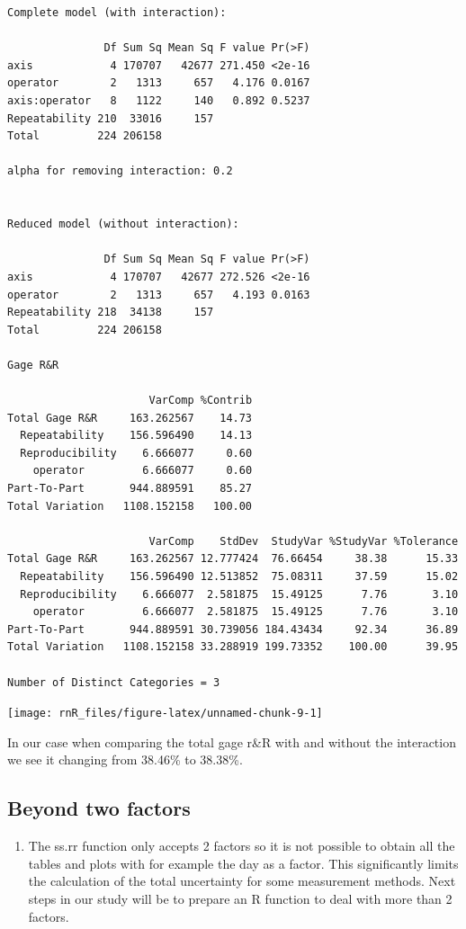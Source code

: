 \documentclass[
]{book}
\providecommand{\tightlist}{%
  \setlength{\itemsep}{0pt}\setlength{\parskip}{0pt}}
\begin{document}
\begin{verbatim}
Complete model (with interaction):

               Df Sum Sq Mean Sq F value Pr(>F)
axis            4 170707   42677 271.450 <2e-16
operator        2   1313     657   4.176 0.0167
axis:operator   8   1122     140   0.892 0.5237
Repeatability 210  33016     157               
Total         224 206158                       

alpha for removing interaction: 0.2 


Reduced model (without interaction):

               Df Sum Sq Mean Sq F value Pr(>F)
axis            4 170707   42677 272.526 <2e-16
operator        2   1313     657   4.193 0.0163
Repeatability 218  34138     157               
Total         224 206158                       

Gage R&R

                      VarComp %Contrib
Total Gage R&R     163.262567    14.73
  Repeatability    156.596490    14.13
  Reproducibility    6.666077     0.60
    operator         6.666077     0.60
Part-To-Part       944.889591    85.27
Total Variation   1108.152158   100.00

                      VarComp    StdDev  StudyVar %StudyVar %Tolerance
Total Gage R&R     163.262567 12.777424  76.66454     38.38      15.33
  Repeatability    156.596490 12.513852  75.08311     37.59      15.02
  Reproducibility    6.666077  2.581875  15.49125      7.76       3.10
    operator         6.666077  2.581875  15.49125      7.76       3.10
Part-To-Part       944.889591 30.739056 184.43434     92.34      36.89
Total Variation   1108.152158 33.288919 199.73352    100.00      39.95

Number of Distinct Categories = 3 
\end{verbatim}

\texttt{[image: rnR\_files/figure-latex/unnamed-chunk-9-1]}

In our case when comparing the total gage r\&R with and without the interaction we see it changing from 38.46\% to 38.38\%.

\hypertarget{beyond-two-factors}{%
\subsection{Beyond two factors}\label{beyond-two-factors}}

\begin{enumerate}
\def\labelenumi{\arabic{enumi})}
\setcounter{enumi}{1}
\tightlist
\item
  The ss.rr function only accepts 2 factors so it is not possible to obtain all the tables and plots with for example the day as a factor.
  This significantly limits the calculation of the total uncertainty for some measurement methods. Next steps in our study will be to prepare an R function to deal with more than 2 factors.
\end{enumerate}
\end{document}
